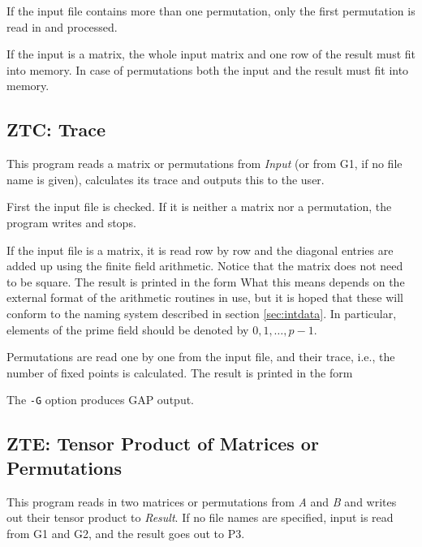 \Bugs
If the input file contains more than one permutation, only the
first permutation is read in and processed.

\Limits
If the input is a matrix, the whole input matrix and one row of the
result must fit into memory. In case of permutations both the input
and the result must fit into memory.



\subsection{ZTC: Trace}
\Syntax
{}

\Description
This program reads a matrix or permutations from {\it Input} (or
from G1, if no file name is given), calculates its trace and
outputs this to the user.

First the input file is checked. If it is neither a matrix nor a
permutation, the program writes
and stops.

If the input file is a matrix, it is read row by row and the diagonal
entries are added up using the finite field arithmetic. Notice that the
matrix does not need to be square. The result is printed in the form
What this means depends on the external format of the arithmetic
routines in use, but it is hoped that these will conform to the naming
system described in section \ref{sec:intdata}. In particular, elements
of the prime field should be denoted by $0,1,\ldots,p-1$.

Permutations are read one by one from the input file, and their trace,
i.e., the number of fixed points is calculated. The result is printed
in the form

The {\tt -G} option produces GAP output.



\subsection{ZTE: Tensor Product of Matrices or Permutations}
\Syntax
{}

\Description
This program reads in two matrices or permutations from {\it A} and
{\it B} and writes out their tensor product to {\it Result}. If no file
names are specified, input is read from G1 and G2, and the result goes
out to P3.

